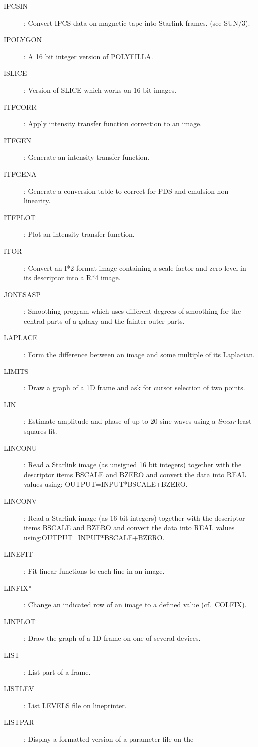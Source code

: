 \begin{description}
\item [IPCSIN]: Convert IPCS data on magnetic tape into Starlink frames.
(see SUN/3).
\item [IPOLYGON]: A 16 bit integer version of POLYFILLA.
\item [ISLICE]: Version of SLICE which works on 16-bit images.
\item [ITFCORR]: Apply intensity transfer function correction to an image.
\item [ITFGEN]: Generate an intensity transfer function.
\item [ITFGENA]: Generate a conversion table to correct for PDS and emulsion
non-linearity.
\item [ITFPLOT]: Plot an intensity transfer function.
\item [ITOR]: Convert an I*2 format image containing a scale factor and zero
level in its descriptor into a R*4 image.
\item [JONESASP]: Smoothing program which uses different degrees of smoothing
for the central parts of a galaxy and the fainter outer parts.
\item [LAPLACE]: Form the difference between an image and some multiple of its
Laplacian.
\item [LIMITS]: Draw a graph of a 1D frame and ask for cursor selection of two
points.
\item [LIN]: Estimate amplitude and phase of up to 20 sine-waves using a
{\em linear} least squares fit.
\item [LINCONU]: Read a Starlink image (as unsigned 16 bit integers) together
with the descriptor items BSCALE and BZERO and convert the data into REAL
values using: \newline OUTPUT=INPUT*BSCALE+BZERO.
\item [LINCONV]: Read a Starlink image (as 16 bit integers) together with the
descriptor items BSCALE and BZERO and convert the data into REAL values
using:\newline OUTPUT=INPUT*BSCALE+BZERO.
\item [LINEFIT]: Fit linear functions to each line in an image.
\item [LINFIX*]: Change an indicated row of an image to a defined value
(cf.\ COLFIX).
\item [LINPLOT]: Draw the graph of a 1D frame on one of several devices.
\item [LIST]: List part of a frame.
\item [LISTLEV]: List LEVELS file on lineprinter.
\item [LISTPAR]: Display a formatted version of a parameter file on the

\end{description}
